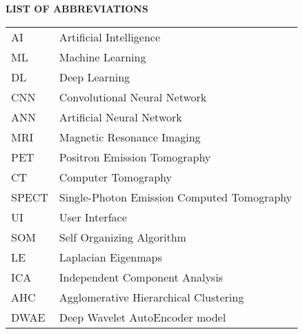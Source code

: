 \begin{center}
{\bf \Large LIST OF ABBREVIATIONS}
\end{center}
\begin{table}[H]
\centering
\begin{tabular}{ll}
AI & Artificial Intelligence\\
ML & Machine Learning\\
DL & Deep Learning\\
CNN & Convolutional Neural Network\\
ANN & Artificial Neural Network\\
MRI & Magnetic Resonance Imaging\\
PET & Positron Emission Tomography\\
CT & Computer Tomography\\
SPECT & Single-Photon Emission Computed Tomography\\
UI & User Interface\\
SOM & Self Organizing Algorithm\\
LE & Laplacian Eigenmaps\\ 
ICA & Independent Component Analysis\\
AHC & Agglomerative Hierarchical Clustering\\
DWAE & Deep Wavelet AutoEncoder model\\
\end{tabular}%
\end{table}